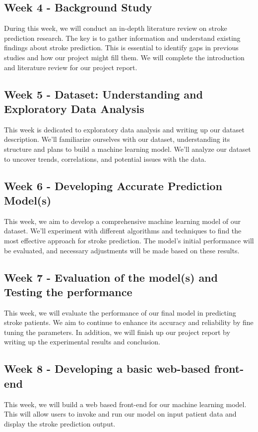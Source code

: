 \documentclass[11pt]{article}
\begin{document}
\subsection*{Week 4 - Background Study}
During this week, we will conduct an in-depth literature review on stroke prediction research. The key is to gather information and understand existing findings about stroke prediction. This is essential to identify gaps in previous studies and how our project might fill them. We will complete the introduction and literature review for our project report.  

\subsection*{Week 5 - Dataset: Understanding and Exploratory Data Analysis}
This week is dedicated to exploratory data analysis and writing up our dataset description. We’ll familiarize ourselves with our dataset, understanding its structure and plans to build a machine learning model. We’ll analyze our dataset to uncover trends, correlations, and potential issues with the data.

\subsection*{Week 6 - Developing Accurate Prediction Model(s)}
This week, we aim to develop a comprehensive machine learning model of our dataset. We’ll experiment with different algorithms and techniques to find the most effective approach for stroke prediction. The model’s initial performance will be evaluated, and necessary adjustments will be made based on these results.  

\subsection*{Week 7 - Evaluation of the model(s) and Testing the performance}
This week, we will evaluate the performance of our final model in predicting stroke patients. We aim to continue to enhance its accuracy and reliability by fine tuning the parameters. In addition, we will finish up our project report by writing up the experimental results and conclusion.

\subsection*{Week 8 - Developing a basic web-based front-end }
This week, we will build a web based front-end for our machine learning model. This will allow users to invoke and run our model on input patient data and display the stroke prediction output.
\end{document}
